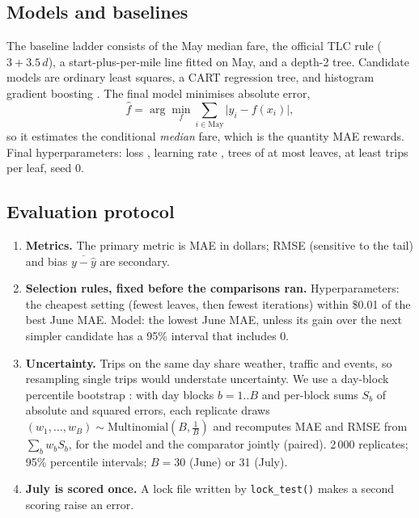 \documentclass[11pt,a4paper]{article}
\newcommand{\usd}[1]{\$#1}%
\newcommand{\code}[1]{\texttt{#1}}
\begin{document}
\subsection{Models and baselines}
The baseline ladder consists of the May median fare, the official TLC rule ($3 + 3.5\,d$), a start-plus-per-mile line fitted on May, and a depth-2 tree. Candidate models are ordinary least squares, a CART regression tree, and histogram gradient boosting \cite{sklearn,lightgbm}. The final model minimises absolute error,
\begin{equation}
  \hat f = \arg\min_f \sum_{i\in\text{May}} \lvert y_i - f(x_i)\rvert ,
\end{equation}
so it estimates the conditional \emph{median} fare, which is the quantity MAE rewards. Final hyperparameters: loss \ParamLoss, learning rate \ParamLearningrate, \ParamMaxiter{} trees of at most \ParamMaxleafnodes{} leaves, at least \ParamMinsamplesleaf{} trips per leaf, seed 0.

\subsection{Evaluation protocol}\label{sec:protocol}
\begin{enumerate}
  \item \textbf{Metrics.} The primary metric is MAE in dollars; RMSE (sensitive to the tail) and bias $\overline{y-\hat y}$ are secondary.
  \item \textbf{Selection rules, fixed before the comparisons ran.} Hyperparameters: the cheapest setting (fewest leaves, then fewest iterations) within \usd{0.01} of the best June MAE. Model: the lowest June MAE, unless its gain over the next simpler candidate has a 95\% interval that includes 0.
  \item \textbf{Uncertainty.} Trips on the same day share weather, traffic and events, so resampling single trips would understate uncertainty. We use a day-block percentile bootstrap \cite{efron,kunsch}: with day blocks $b=1..B$ and per-block sums $S_b$ of absolute and squared errors, each replicate draws $(w_1,\dots,w_B)\sim\text{Multinomial}(B,\tfrac1B)$ and recomputes MAE and RMSE from $\sum_b w_b S_b$, for the model and the comparator jointly (paired). 2\,000 replicates; 95\% percentile intervals; $B=30$ (June) or 31 (July).
  \item \textbf{July is scored once.} A lock file written by \code{lock\_test()} makes a second scoring raise an error.
\end{enumerate}
\end{document}
